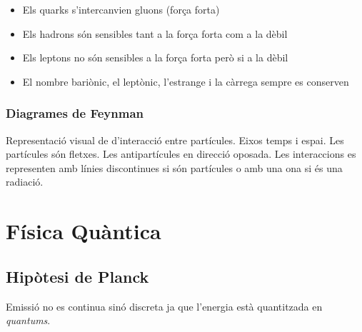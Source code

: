 \begin{itemize}
    \item Els quarks s'intercanvien gluons (força forta)
    \item Els hadrons són sensibles tant a la força forta com a la dèbil
    \item Els leptons no són sensibles a la força forta però si a la dèbil
    \item El nombre bariònic, el leptònic, l'estrange i la càrrega sempre es
    conserven
\end{itemize}

\subsubsection{Diagrames de Feynman}
\label{ssub:diagrames_de_feynman}

Representació visual de d'interacció entre partícules. Eixos temps i espai.
Les partícules són fletxes. Les antipartícules en direcció oposada. Les
interaccions es representen amb línies discontinues si són partícules o amb una
ona si és una radiació.

\begin{center}
\end{center}

\section{Física Quàntica}
\label{sec:fisica_quantica}

\subsection{Hipòtesi de Planck}
\label{sub:hipotesi_de_planck}

Emissió no es continua sinó discreta ja que l'energia està quantitzada en 
\emph{quantums}.


